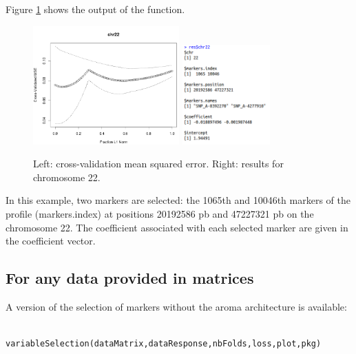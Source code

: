 \documentclass[a4paper,10pt]{article}
\begin{document}
	Figure \ref{SNPoutput} shows the output of the function.
		\begin{figure}[!h]
			\includegraphics[width=0.5\textwidth]{fig/cvcourbe}
			\includegraphics[width=0.3\textwidth]{fig/snpselectres}
			\caption{Left: cross-validation mean squared error. Right: results for chromosome 22.}
			\label{SNPoutput}
		\end{figure}

		In this example, two markers are selected: the 1065th and 10046th markers of the profile (markers.index) at positions 20192586 pb and 47227321 pb on the chromosome 22. The coefficient associated with each selected marker are given in the coefficient vector.

	\subsection{For any data provided in matrices}	

		A version of the selection of markers without the aroma architecture is available:
		
		\begin{verbatim}
			variableSelection(dataMatrix,dataResponse,nbFolds,loss,plot,pkg)
		\end{verbatim}
		
\end{document}
